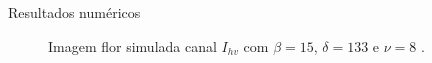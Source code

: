 \documentclass[10pt]{beamer}
\begin{document}
\begin{frame}{Resultados numéricos}
\begin{figure}[hbt]
	\caption{Imagem flor simulada canal $I_{hv}$ com $\beta = 15$, $\delta = 133$ e $\nu = 8$ .}
\endminipage\hfill
\centering
{}

\end{figure}
\end{frame}
\end{document}
